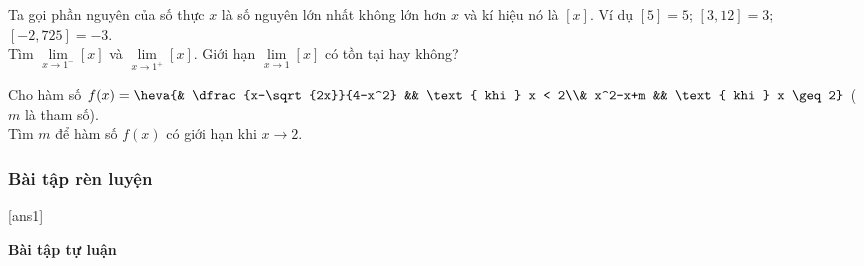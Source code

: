 \begin{vd}%
Ta gọi phần nguyên của số thực $x$ là số nguyên lớn nhất không lớn hơn $x$ và kí hiệu nó là $[x]$. 
Ví dụ $[5]=5 $; $[3,12]=3 $; $[-2{,}725]=-3$. \\
Tìm $\lim\limits _{x \rightarrow 1^{-}} [x]$ và  $\lim\limits _{x \rightarrow 1^{+}} [x]$. Giới hạn $\lim\limits _{x \rightarrow 1} [x]$ có tồn tại hay không?
\end{vd}


\begin{vd}%
Cho hàm số $f(x) = \heva{& \dfrac{x-\sqrt{2x}}{4-x^2} && \text{ khi } x < 2\\& x^2-x+m && \text{ khi } x \geq  2}$  ($m$ là tham số). \\
Tìm $m$ để hàm số $f(x)$ có giới hạn khi $x \to 2$.
\end{vd}




\subsubsection{Bài tập rèn luyện}
[ans1]

\noindent \textbf{Bài tập tự luận}

